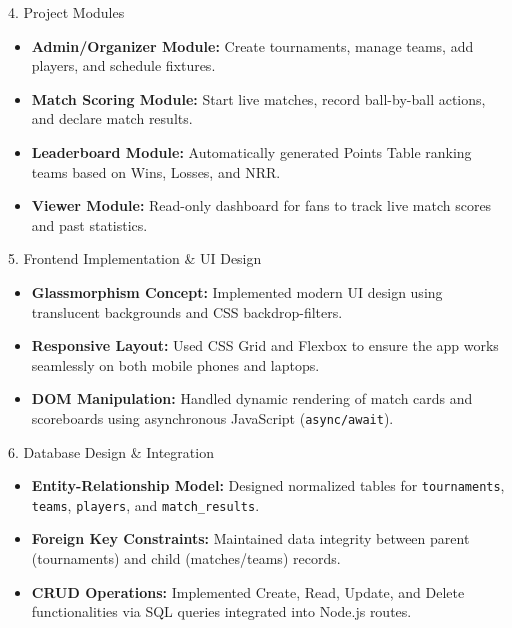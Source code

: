 \documentclass[12pt]{beamer}
\begin{document}
\begin{frame}{4. Project Modules}
    \begin{itemize}
        \item \textbf{Admin/Organizer Module:} Create tournaments, manage teams, add players, and schedule fixtures.
        \item \textbf{Match Scoring Module:} Start live matches, record ball-by-ball actions, and declare match results.
        \item \textbf{Leaderboard Module:} Automatically generated Points Table ranking teams based on Wins, Losses, and NRR.
        \item \textbf{Viewer Module:} Read-only dashboard for fans to track live match scores and past statistics.
    \end{itemize}
\end{frame}

\begin{frame}{5. Frontend Implementation \& UI Design}
    \begin{itemize}
        \item \textbf{Glassmorphism Concept:} Implemented modern UI design using translucent backgrounds and CSS backdrop-filters.
        \item \textbf{Responsive Layout:} Used CSS Grid and Flexbox to ensure the app works seamlessly on both mobile phones and laptops.
        \item \textbf{DOM Manipulation:} Handled dynamic rendering of match cards and scoreboards using asynchronous JavaScript (\texttt{async/await}).
    \end{itemize}
\end{frame}

\begin{frame}{6. Database Design \& Integration}
    \begin{itemize}
        \item \textbf{Entity-Relationship Model:} Designed normalized tables for \texttt{tournaments}, \texttt{teams}, \texttt{players}, and \texttt{match\_results}.
        \item \textbf{Foreign Key Constraints:} Maintained data integrity between parent (tournaments) and child (matches/teams) records.
        \item \textbf{CRUD Operations:} Implemented Create, Read, Update, and Delete functionalities via SQL queries integrated into Node.js routes.
    \end{itemize}
\end{frame}
\end{document}
